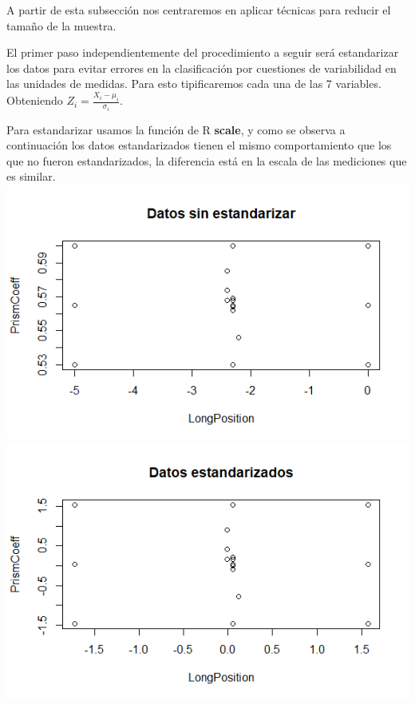 \documentclass[twoside]{article}
\begin{document}
\begin{multicols}{2}
A partir de esta subsecci\'on nos centraremos en aplicar t\'ecnicas para reducir el tama\~no de la muestra.

El primer paso independientemente del procedimiento a seguir ser\'a estandarizar los datos para evitar errores en la clasificaci\'on por cuestiones de variabilidad en las unidades de medidas. Para esto tipificaremos cada una de las 7 variables. Obteniendo
$Z_i = \frac{X_i - \mu_i}{\sigma_i}$.

Para estandarizar usamos la funci\'on de R \textbf{scale}, y como se observa a continuaci\'on los datos estandarizados tienen el mismo comportamiento que los que no fueron estandarizados, la diferencia est\'a en la escala de las mediciones que es similar.\\

\includegraphics[scale = 0.4]{images/pic_27.png} \\
\includegraphics[scale = 0.4]{images/pic_28.png} \\


\end{multicols}
\end{document}
